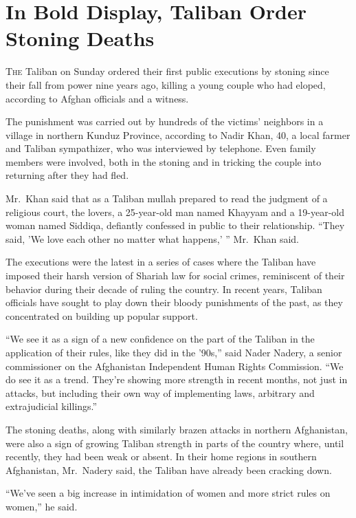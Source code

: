 ﻿\documentclass[12pt]{article}
\begin{document}
\section{In Bold Display, Taliban Order Stoning Deaths}

\lettrine{T}{he} Taliban on Sunday ordered their first public executions by
stoning since their fall from power nine years ago, killing a young couple who had eloped, according
to Afghan officials and a witness.

The punishment was carried out by hundreds of the victims' neighbors in a village in northern Kunduz
Province, according to Nadir Khan, 40, a local farmer and Taliban sympathizer, who was interviewed
by telephone. Even family members were involved, both in the stoning and in tricking the couple into
returning after they had fled.

Mr.~Khan said that as a Taliban mullah prepared to read the judgment of a religious court, the
lovers, a 25-year-old man named Khayyam and a 19-year-old woman named Siddiqa, defiantly confessed
in public to their relationship. ``They said, 'We love each other no matter what happens,' ''
Mr.~Khan said.

The executions were the latest in a series of cases where the Taliban have imposed their harsh
version of Shariah law for social crimes, reminiscent of their behavior during their decade of
ruling the country. In recent years, Taliban officials have sought to play down their bloody
punishments of the past, as they concentrated on building up popular support.

``We see it as a sign of a new confidence on the part of the Taliban in the application of their
rules, like they did in the '90s,'' said Nader Nadery, a senior commissioner on the Afghanistan
Independent Human Rights Commission. ``We do see it as a trend. They're showing more strength in
recent months, not just in attacks, but including their own way of implementing laws, arbitrary and
extrajudicial killings.''

The stoning deaths, along with similarly brazen attacks in northern Afghanistan, were also a sign of
growing Taliban strength in parts of the country where, until recently, they had been weak or
absent. In their home regions in southern Afghanistan, Mr.~Nadery said, the Taliban have already
been cracking down.

``We've seen a big increase in intimidation of women and more strict rules on women,'' he said.
\end{document}
